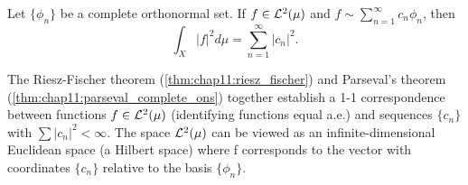 \begin{theorem}
  \label{thm:chap11:parseval_complete_ons}
  Let $\{ \phi_n \}$ be a complete orthonormal set. If $f \in
  \mathcal{L}^{2}(\mu)$ and $f \sim \sum_{n=1}^\infty c_n \phi_n$, then
  \[
    \int_X |f|^2 d\mu = \sum_{n=1}^\infty |c_n|^2.
  \]
\end{theorem}

\begin{remark}
  \label{rem:chap11:hilbert_space}
  The Riesz-Fischer theorem (\ref{thm:chap11:riesz_fischer}) and
  Parseval's theorem (\ref{thm:chap11:parseval_complete_ons})
  together establish a 1-1 correspondence between functions $f \in
  \mathcal{L}^{2}(\mu)$ (identifying functions equal a.e.) and sequences $\{
  c_n \}$ with $\sum |c_n|^2 < \infty$. The space $\mathcal{L}^{2}(\mu)$ can
  be viewed as an infinite-dimensional Euclidean space (a Hilbert
  space) where f corresponds to the vector with coordinates $\{ c_n
  \}$ relative to the basis $\{ \phi_n \}$.
\end{remark}

